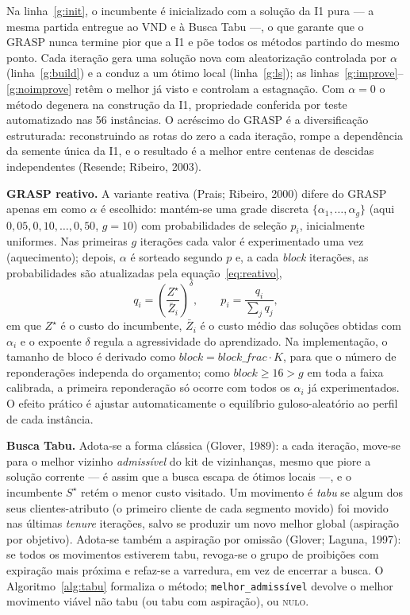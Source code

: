\documentclass[10pt,a4paper]{article}
\begin{document}
Na linha~\ref{g:init}, o incumbente é inicializado com a solução da I1 pura --- a mesma partida entregue ao VND e à Busca Tabu ---, o que garante que o GRASP nunca termine pior que a I1 e põe todos os métodos partindo do mesmo ponto. Cada iteração gera uma solução nova com aleatorização controlada por $\alpha$ (linha~\ref{g:build}) e a conduz a um ótimo local (linha~\ref{g:ls}); as linhas~\ref{g:improve}--\ref{g:noimprove} retêm o melhor já visto e controlam a estagnação. Com $\alpha=0$ o método degenera na construção da I1, propriedade conferida por teste automatizado nas 56 instâncias. O acréscimo do GRASP é a diversificação estruturada: reconstruindo as rotas do zero a cada iteração, rompe a dependência da semente única da I1, e o resultado é a melhor entre centenas de descidas independentes (Resende; Ribeiro, 2003).

\vspace{\baselineskip}
\textbf{GRASP reativo.} A variante reativa (Prais; Ribeiro, 2000) difere do GRASP apenas em como $\alpha$ é escolhido: mantém-se uma grade discreta $\{\alpha_1,\dots,\alpha_g\}$ (aqui $0{,}05, 0{,}10, \dots, 0{,}50$, $g=10$) com probabilidades de seleção $p_i$, inicialmente uniformes. Nas primeiras $g$ iterações cada valor é experimentado uma vez (aquecimento); depois, $\alpha$ é sorteado segundo $p$ e, a cada \textit{block} iterações, as probabilidades são atualizadas pela equação~\eqref{eq:reativo},
\begin{equation}
q_i=\left(\frac{Z^{\star}}{\bar{Z}_i}\right)^{\!\delta},\qquad p_i=\frac{q_i}{\sum_{j} q_j},
\label{eq:reativo}
\end{equation}
em que $Z^{\star}$ é o custo do incumbente, $\bar{Z}_i$ é o custo médio das soluções obtidas com $\alpha_i$ e o expoente $\delta$ regula a agressividade do aprendizado. Na implementação, o tamanho de bloco é derivado como $\mathit{block}=\mathit{block\_frac}\cdot K$, para que o número de reponderações independa do orçamento; como $\mathit{block}\ge 16 > g$ em toda a faixa calibrada, a primeira reponderação só ocorre com todos os $\alpha_i$ já experimentados. O efeito prático é ajustar automaticamente o equilíbrio guloso-aleatório ao perfil de cada instância.

\vspace{\baselineskip}
\textbf{Busca Tabu.} Adota-se a forma clássica (Glover, 1989): a cada iteração, move-se para o melhor vizinho \emph{admissível} do kit de vizinhanças, mesmo que piore a solução corrente --- é assim que a busca escapa de ótimos locais ---, e o incumbente $S^{\star}$ retém o menor custo visitado. Um movimento é \emph{tabu} se algum dos seus clientes-atributo (o primeiro cliente de cada segmento movido) foi movido nas últimas \textit{tenure} iterações, salvo se produzir um novo melhor global (aspiração por objetivo). Adota-se também a aspiração por omissão (Glover; Laguna, 1997): se todos os movimentos estiverem tabu, revoga-se o grupo de proibições com expiração mais próxima e refaz-se a varredura, em vez de encerrar a busca. O Algoritmo~\ref{alg:tabu} formaliza o método; \texttt{melhor\_admiss\'ivel} devolve o melhor movimento viável não tabu (ou tabu com aspiração), ou \textsc{nulo}.
\end{document}
